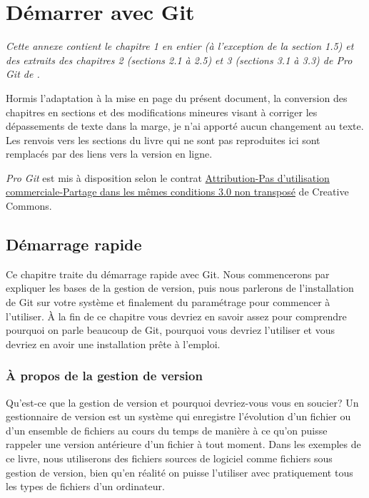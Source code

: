 \chapter{Démarrer avec Git}
\label{chap:git}

\begingroup
{}
\raggedbottom

{%
  \itshape%
  Cette annexe contient le chapitre 1 en entier (à l'exception de la
  section 1.5) et des extraits des chapitres 2 (sections 2.1 à 2.5) et
  3 (sections 3.1 à 3.3) de \emph{Pro Git} de \citet{ProGit:2e:2014}.

  Hormis l'adaptation à la mise en page du présent document, la
  conversion des chapitres en sections et des modifications mineures
  visant à corriger les dépassements de texte dans la marge, je n'ai
  apporté aucun changement au texte. Les renvois vers les sections du
  livre qui ne sont pas reproduites ici sont remplacés par des liens
  vers la version en ligne.

  \emph{Pro Git} est mis à disposition selon le contrat
  \href{http://creativecommons.org/licenses/by-sa/4.0/deed.fr}{%
    Attribution-Pas d’utilisation commerciale-Partage dans les mêmes
    conditions 3.0 non transposé} de Creative Commons. %
}

\section{Démarrage rapide}
\label{sec:git:getting_started}

Ce chapitre traite du démarrage rapide avec Git.
Nous commencerons par expliquer les bases de la gestion de version, puis nous parlerons de l'installation de Git sur votre système et finalement du paramétrage pour commencer à l'utiliser.
À la fin de ce chapitre vous devriez en savoir assez pour comprendre pourquoi on parle beaucoup de Git, pourquoi vous devriez l'utiliser et vous devriez en avoir une installation prête à l'emploi.

\subsection{À propos de la gestion de version}

Qu'est-ce que la gestion de version et pourquoi devriez-vous vous en soucier?
Un gestionnaire de version est un système qui enregistre l'évolution d'un fichier ou d'un ensemble de fichiers au cours du temps de manière à ce qu'on puisse rappeler une version antérieure d'un fichier à tout moment.
Dans les exemples de ce livre, nous utiliserons des fichiers sources de logiciel comme fichiers sous gestion de version, bien qu'en réalité on puisse l'utiliser avec pratiquement tous les types de fichiers d'un ordinateur.

